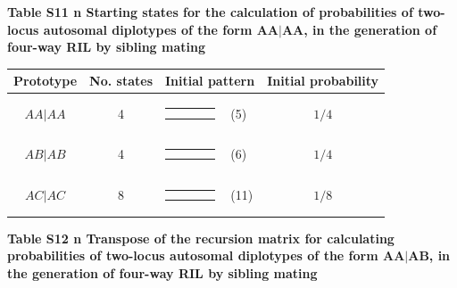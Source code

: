 \documentclass[9pt,letterpaper,twoside]{article}
\begin{document}
\newpage

\noindent \textbf{Table S11 {\color{white} n} Starting states for the calculation of
probabilities of two-locus autosomal diplotypes of the form $\boldsymbol{AA|AA}$,
in the generation of four-way RIL by sibling mating}

\bigskip

{
\begin{center}
\begin{tabular}{ccrlc} \hline
Prototype & No. states & \multicolumn{2}{c}{Initial pattern} & Initial probability \\ \hline
$AA|AA$ & 4 & 
{\renewcommand{\arraystretch}{0.3}
\renewcommand{\tabcolsep}{0.5mm}
\parbox[b][3mm][c]{12mm}{
\begin{tabular}{|p{2mm}|p{2mm}||p{2mm}|p{2mm}|} \hline
$\bullet$ &           &           &           \\
$\bullet$ &           &           &           \\ \hline
\end{tabular}}}
& (5) & $1/4$ \\
$AB|AB$ & 4 & 
{\renewcommand{\arraystretch}{0.3}
\renewcommand{\tabcolsep}{0.5mm}
\parbox[b][3mm][c]{12mm}{
\begin{tabular}{|p{2mm}|p{2mm}||p{2mm}|p{2mm}|} \hline
$\bullet$ &           &           &           \\
          & $\bullet$ &           &           \\ \hline
\end{tabular}}}
& (6) & $1/4$ \\
$AC|AC$ & 8 & 
{\renewcommand{\arraystretch}{0.3}
\renewcommand{\tabcolsep}{0.5mm}
\parbox[b][3mm][c]{12mm}{
\begin{tabular}{|p{2mm}|p{2mm}||p{2mm}|p{2mm}|} \hline
$\bullet$ &           &           &           \\
          &           & $\bullet$ &           \\ \hline
\end{tabular}}}
& (11) & $1/8$ \\
\hline
\end{tabular}
\end{center}
}

\newpage

\noindent \textbf{Table S12 {\color{white} n} Transpose of the recursion matrix for
calculating probabilities of two-locus autosomal diplotypes of the form $\boldsymbol{AA|AB}$,
in the generation of four-way RIL by sibling mating}
\end{document}
